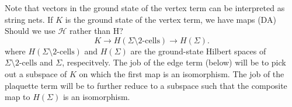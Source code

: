 \documentclass[12pt,a4paper]{article}
\newcommand{\tp}{\otimes}
\newcommand{\unit}{\mathds{1}}
\newcommand{\mch}{\mathcal{H}}
\newcommand\be            {\begin{equation}}
\newcommand\ee            {\end{equation}}
\newcommand{\kw}[1]{{\color{kwcolor}\footnotesize{(KW) #1}}}
\newcommand{\ket}[1]{\ensuremath{\left|#1\right\rangle}}
\newcommand{\dave}[1]{{\color{ao(english)}\footnotesize{(DA) #1}}}
\newcommand{\ethan}[1]{{\color{amethyst}\footnotesize{(EL) #1}}}
\begin{document}
Note that vectors in the ground state of the vertex term can be interpreted as string nets.
If $K$ is the ground state of the vertex term, we have maps
\dave{Should we use $\mch$ rather than H?}
\be
	K \to H(\Sigma \setminus \mbox{2-cells}) \to H(\Sigma) .
	\label{ground_state_projection}
\ee
where $H(\Sigma \setminus \mbox{2-cells})$ and $H(\Sigma)$ are the ground-state Hilbert spaces of $\Sigma \setminus \mbox{2-cells}$ and $\Sigma$, respecitvely.
The job of the edge term (below) will be to pick out a subspace of $K$ on which the first map is an isomorphism. 
The job of the plaquette term will be to further reduce to a subspace such that the composite map to $H(\Sigma)$ is an isomorphism.

\end{document}
